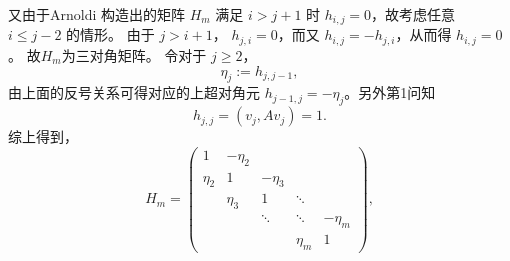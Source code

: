 \documentclass{ctexart}
\begin{document}
\begin{solution}
\begin{enumerate}
      又由于Arnoldi 构造出的矩阵 $H_m$
      满足 $i>j+1$ 时 $h_{i,j}=0$，故考虑任意 $i\le j-2$ 的情形。
      由于 $j>i+1$， $h_{j,i}=0$，而又 $h_{i,j}=-h_{j,i}$，从而得 $h_{i,j}=0$。
      故\(H_m \)为三对角矩阵。
      令对于 $j\ge2$，
      \[
        \eta_j := h_{j,j-1},
      \]
      由上面的反号关系可得对应的上超对角元 $h_{j-1,j}=-\eta_j$。另外第1问知
      \[
        h_{j,j} = (v_j, A v_j) = 1.
      \]
      综上得到，
      \[
        H_m=
        \begin{pmatrix}
          1 & -\eta_2 &  &  &  \\
          \eta_2 & 1 & -\eta_3 &  &  \\
          & \eta_3 & 1 & \ddots &  \\
          &  & \ddots & \ddots & -\eta_m \\
          &  &  & \eta_m & 1
        \end{pmatrix},
      \]


\end{enumerate}
\end{solution}
\end{document}
